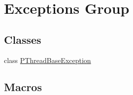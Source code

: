 \hypertarget{group__EXCEPT__GROUP}{}\section{Exceptions Group}
\label{group__EXCEPT__GROUP}
\subsection*{Classes}
\begin{DoxyCompactItemize}
\item 
class \hyperlink{classPThreadBaseException}{P\+Thread\+Base\+Exception}
\end{DoxyCompactItemize}
\subsection*{Macros}
